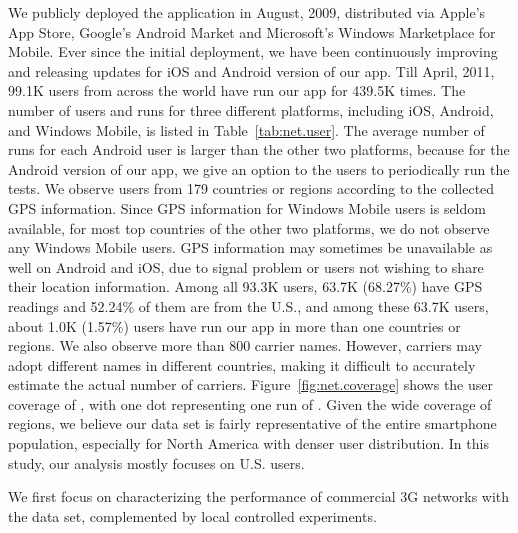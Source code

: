 We publicly deployed the \mobiperf application in August, 2009, distributed via Apple's App Store, Google's Android Market and Microsoft's Windows Marketplace for Mobile. Ever since the initial deployment, we have been continuously improving and releasing updates for iOS and Android version of our app. Till April, 2011, 99.1K users from across the world have run our app for 439.5K times. The number of users and runs for three different platforms, including iOS, Android, and Windows Mobile, is listed in Table~\ref{tab:net.user}. The average number of runs for each Android user is larger than the other two platforms, because for the Android version of our app, we give an option to the users to periodically run the tests. We observe users from 179 countries or regions according to the collected GPS information. Since GPS information for Windows Mobile users is seldom available, for most top countries of the other two platforms, we do not observe any Windows Mobile users. GPS information may sometimes be unavailable as well on Android and iOS, due to signal problem or users not wishing to share their location information. Among all 93.3K users, 63.7K (68.27\%) have GPS readings and 52.24\% of them are from the U.S., and among these 63.7K users, about 1.0K (1.57\%) users have run our app in more than one countries or regions. We also observe more than 800 carrier names. However, carriers may adopt different names in different countries, making it difficult to accurately estimate the actual number of carriers. Figure~\ref{fig:net.coverage} shows the user coverage of \mobiperf, with one dot representing one run of \mobiperf. Given the wide coverage of regions, we believe our data set is fairly representative of the entire smartphone population, especially for North America with denser user distribution. In this study, our analysis mostly focuses on U.S. users.


\label{sec:net.3g}
We first focus on characterizing the performance of commercial 3G networks with the \mobiperf data set, complemented by local controlled experiments.

\label{sec:net.carrier}
 
